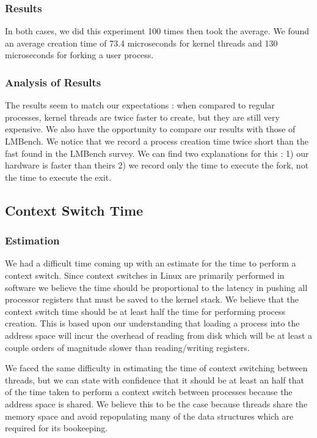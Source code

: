 \subsubsection{Results}

In both cases, we did this experiment 100 times then took the average. We found an average creation time of  73.4 microseconds for kernel threads and 130 microseconds for forking a user process.

\subsubsection{Analysis of Results}

The results seem to match our expectations : when compared to regular processes, kernel threads are twice faster to create, but they are still very expensive. We also have the opportunity to compare our results with those of LMBench. We notice that we record a process creation time twice short than the fast found in the LMBench survey. We can find two explanations for this : 1) our hardware is faster than theirs 2) we record only the time to execute the fork, not the time to execute the exit.

\subsection{Context Switch Time} 

\subsubsection{Estimation}

We had a difficult time coming up with an estimate for the time to perform a
context switch. Since context switches in Linux are primarily performed in
software we believe the time should be proportional to the latency in pushing
all processor registers that must be saved to the kernel stack. We believe that 
the context switch time should be at least half the time for performing process 
creation. This is based upon our understanding that loading a process into the 
address space will incur the overhead of reading from disk which will be at 
least a couple orders of magnitude slower than reading/writing registers.

We faced the same difficulty in estimating the time of context switching
between threads, but we can state with confidence that it should be at least an
half that of the time taken to perform a context switch between
processes because the address space is shared. We believe this to be the case 
because threads share the memory space and avoid repopulating many of the data 
structures which are required for its bookeeping.

